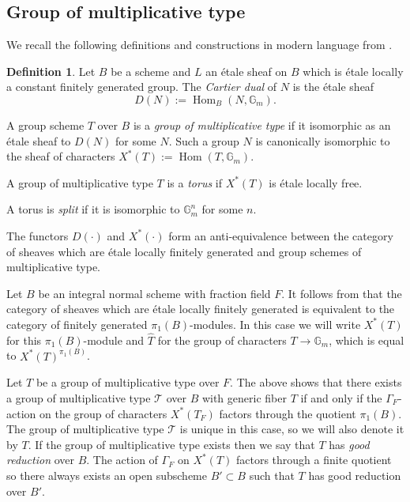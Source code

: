 \documentclass[a4paper,11pt,reqno]{amsart}
\newcommand{\G}{\mathbb{G}}
\DeclareMathOperator{\Hom}{Hom}
\theoremstyle{definition}
\newtheorem{definition}[theorem]{Definition}
\begin{document}
\subsection{Group of multiplicative type} 
We recall the following definitions and constructions in modern language from \cite{Ono191Arithmetic}.
\begin{definition}
	Let $B$ be a scheme and $L$ an \'etale sheaf on $B$ which is \'etale locally a constant finitely generated group. The \emph{Cartier dual} of $N$ is the \'etale sheaf
	\begin{equation*}
		D(N) := \Hom_B(N, \G_m).
	\end{equation*}
	
	A group scheme $T$ over $B$ is a \emph{group of multiplicative type} if it isomorphic as an \'etale sheaf to $D(N)$ for some $N$. Such a group $N$ is canonically isomorphic to the sheaf of characters $X^*(T) := \Hom(T, \G_m)$.
	
	A group of multiplicative type $T$ is a \emph{torus} if $X^*(T)$ is \'etale locally free.
	
	A torus is \emph{split} if it is isomorphic to $\G_m^n$ for some $n$.
\end{definition}
The functors $D(\cdot)$ and $X^*(\cdot)$ form an anti-equivalence between the category of sheaves which are \'etale locally finitely generated and group schemes of multiplicative type.

Let $B$ be an integral normal scheme with fraction field $F$. It follows from \cite[\href{https://varieties.math.columbia.edu/tag/0DV5}{Tag 0DV5}]{stacks-project} that the category of sheaves which are \'etale locally finitely generated is equivalent to the category of finitely generated $\pi_1(B)$-modules. In this case we will write $X^*(T)$ for this $\pi_1(B)$-module and $\hat{T}$ for the group of characters $T \to \G_m$, which is equal to $X^*(T)^{\pi_1(B)}$.

Let $T$ be a group of multiplicative type over $F$. The above shows that there exists a group of multiplicative type $\mathcal{T}$ over $B$ with generic fiber $T$ if and only if the $\Gamma_F$-action on the group of characters $X^*(T_{F})$ factors through the quotient $\pi_1(B)$. The group of multiplicative type $\mathcal{T}$ is unique in this case, so we will also denote it by $T$. If the group of multiplicative type exists then we say that $T$ has \emph{good reduction} over $B$. The action of $\Gamma_F$ on $X^*(T)$ factors through a finite quotient so there always exists an open subscheme $B' \subset B$ such that $T$ has good reduction over $B'$. 
\end{document}
